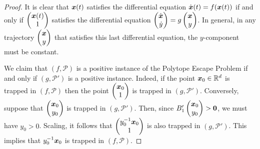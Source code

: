 \begin{proof}
It is clear that $\boldsymbol{x}(t)$ satisfies the differential equation
$\dot{\boldsymbol{x}}(t)=f(\boldsymbol{x}(t))$ if and only if
$\begin{pmatrix}
\boldsymbol{x}(t)\\1 \end{pmatrix}$ satisfies
the differential equation
$\begin{pmatrix}\dot{\boldsymbol{x}}\\
\dot{y}
\end{pmatrix} = g\begin{pmatrix}\boldsymbol{x}\\y
\end{pmatrix}$.  In general,
in any trajectory $\begin{pmatrix}\boldsymbol{x}\\y
\end{pmatrix}$ that satisfies this last differential equation, the
$y$-component must be constant.

We claim that $(f,\mathcal{P})$ is a positive instance
of the Polytope Escape Problem if and
only if $(g,\mathcal{P}')$ is a positive instance.
Indeed, if the point
$\boldsymbol{x}_0 \in \mathbb{R}^{d}$ is trapped
in $(f,\mathcal{P})$
then the point $\begin{pmatrix}\boldsymbol{x}_0\\1
\end{pmatrix}$ is trapped in $(g,\mathcal{P}')$.
Conversely, suppose that $\begin{pmatrix}\boldsymbol{x}_0\\y_0
\end{pmatrix}$ is trapped in  $(g,\mathcal{P}')$.  Then,
since $B_{1}'\begin{pmatrix}\boldsymbol{x}_0\\y_0
\end{pmatrix}
> \boldsymbol{0}$,
we must have $y_0>0$.  Scaling, it follows that
$\begin{pmatrix} y_0^{-1}\boldsymbol{x}_0\\1
\end{pmatrix}$ is also trapped in $(g,\mathcal{P}')$.  This implies
that $y_0^{-1}\boldsymbol{x}_0$ is trapped in $(f,\mathcal{P})$.
%
\end{proof}

